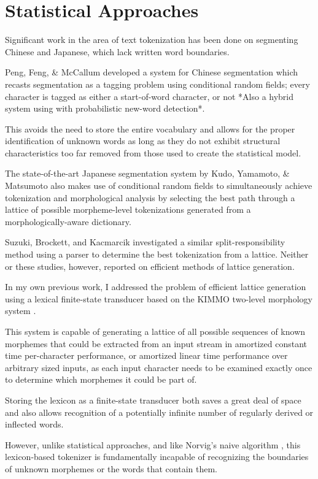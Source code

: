 \section{Statistical Approaches}


Significant work in the area of text tokenization has been done on segmenting Chinese and Japanese, which lack written word boundaries.

Peng, Feng, \& McCallum\cite{peng04} developed a system for Chinese segmentation which recasts segmentation as a tagging problem using conditional random fields; every character is tagged as either a start-of-word character, or not *Also a hybrid system using with probabilistic new-word detection*.

This avoids the need to store the entire vocabulary and allows for the proper identification of unknown words as long as they do not exhibit structural characteristics too far removed from those used to create the statistical model.

The state-of-the-art Japanese segmentation system by Kudo, Yamamoto, \& Matsumoto\cite{kudo04} also makes use of conditional random fields to simultaneously achieve tokenization and morphological analysis by selecting the best path through a lattice of possible morpheme-level tokenizations generated from a morphologically-aware dictionary.

Suzuki, Brockett, and Kacmarcik\cite{suzuki00} investigated a similar split-responsibility method using a parser to determine the best tokenization from a lattice. Neither or these studies, however, reported on efficient methods of lattice generation.

In my own previous work, I addressed the problem of efficient lattice generation using a lexical finite-state transducer based on the KIMMO two-level morphology system \cite{koskenniemi84}. 

This system is capable of generating a lattice of all possible sequences of known morphemes that could be extracted from an input stream in amortized constant time per-character performance, or amortized linear time performance over arbitrary sized inputs, as each input character needs to be examined exactly once to determine which morphemes it could be part of\cite{kearsley13}.

Storing the lexicon as a finite-state transducer both saves a great deal of space and also allows recognition of a potentially infinite number of regularly derived or inflected words.

However, unlike statistical approaches, and like Norvig's naive algorithm \cite{norvig14}, this lexicon-based tokenizer is fundamentally incapable of recognizing the boundaries of unknown morphemes or the words that contain them.

